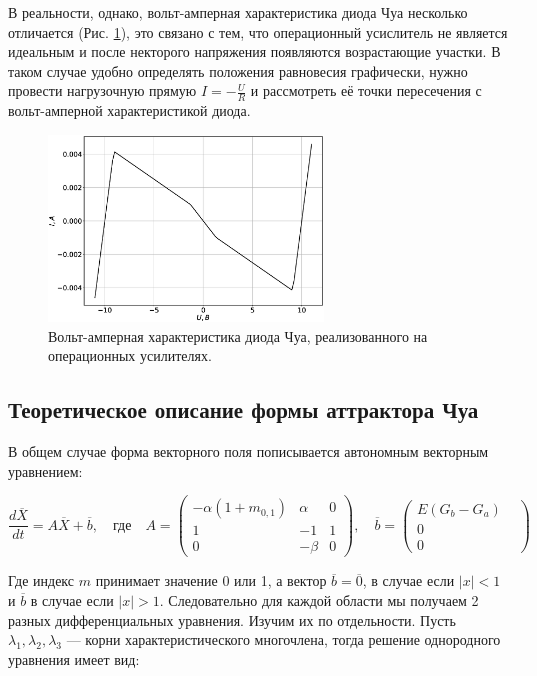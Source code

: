 \documentclass[12pt]{article}
\begin{document}
В реальности, однако, вольт-амперная характеристика диода Чуа несколько отличается (Рис. \ref{fig:VAC}), это
связано с тем, что операционный усислитель не является идеальным и после некторого напряжения появляются возрастающие участки.
В таком случае удобно определять положения равновесия графически, нужно провести нагрузочную прямую $I = -\frac{U}{R}$ и рассмотреть
её точки пересечения с вольт-амперной характеристикой диода.
\begin{figure}[H]
	\centering
	\includegraphics[width=0.65\textwidth]{VAC.eps}
	\caption{Вольт-амперная характеристика диода Чуа, реализованного на операционных усилителях.}
	\label{fig:VAC}
\end{figure}


\subsection*{Теоретическое описание формы аттрактора Чуа}

В общем случае форма векторного поля пописывается  автономным векторным уравнением:

\begin{equation}
	\frac{d\overline{X}}{dt} = A\overline{X} + \overline{b}, \quad \textit{где}
	\quad A=
	\begin{pmatrix}
		-\alpha(1+m_{0, 1}) & \alpha & 0 \\
		1                   & -1     & 1 \\
		0                   & -\beta & 0
	\end{pmatrix},
	\quad \overline{b} =
	\begin{pmatrix}
		E(G_b - G_a) \\
		0 &          \\
		0 &
	\end{pmatrix}
\end{equation}


Где индекс $m$ принимает значение 0 или 1, а вектор $\overline{b}=\overline{0}$, 
в случае если $|x| < 1$ и $\overline{b}$ в случае если  $|x| > 1$. 
Следовательно для каждой области мы получаем 2 разных дифференциальных уравнения. 
Изучим их по отдельности. Пусть $\lambda_1, \lambda_2, \lambda_3$ --- корни характеристического многочлена, 
тогда решение однородного уравнения имеет вид:
\end{document}
